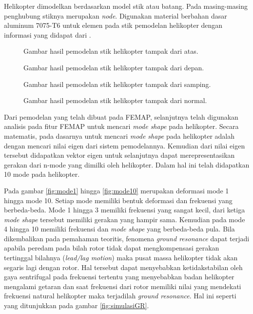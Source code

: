 Helikopter dimodelkan berdasarkan model stik atau batang. Pada masing-masing penghubung stiknya merupakan \textit{node}. Digunakan material berbahan dasar aluminum 7075-T6 untuk elemen pada stik pemodelan helikopter dengan informasi yang didapat dari \cite{ASTM}.

\begin{figure}[H]
	\centering
	\caption{Gambar hasil pemodelan stik helikopter tampak dari atas.}
	\label{fig:simulasi_tampak_atas}
\end{figure}

\begin{figure}[H]
	\centering
	\caption{Gambar hasil pemodelan stik helikopter tampak dari depan.}
	\label{fig:simulasi_tampak_depan}
\end{figure}

\begin{figure}[H]
	\centering
	\caption{Gambar hasil pemodelan stik helikopter tampak dari samping.}
	\label{fig:simulasi_tampak_samping}
\end{figure}

\begin{figure}[H]
	\centering
	\caption{Gambar hasil pemodelan stik helikopter tampak dari normal.}
	\label{fig:simulasi_tampak_normal}
\end{figure}

Dari pemodelan yang telah dibuat pada FEMAP, selanjutnya telah digunakan analisis pada fitur FEMAP untuk mencari \textit{mode shape} pada helikopter. Secara matematis, pada dasarnya untuk mencari \textit{mode shape} pada helikopter adalah dengan mencari nilai eigen dari sistem pemodelannya. Kemudian dari nilai eigen tersebut didapatkan vektor eigen untuk selanjutnya dapat merepresentasikan gerakan dari n-mode yang dimilki oleh helikopter. Dalam hal ini telah didapatkan 10 mode pada helikopter.

Pada gambar \ref{fig:mode1} hingga \ref{fig:mode10} merupakan deformasi mode 1 hingga mode 10. Setiap mode memiliki bentuk deformasi dan frekuensi yang berbeda-beda. Mode 1 hingga 3 memiliki frekuensi yang sangat kecil, dari ketiga \textit{mode shape} tersebut memiliki gerakan yang hampir sama. Kemudian pada mode 4 hingga 10 memiliki frekuensi dan \textit{mode shape} yang berbeda-beda pula. Bila dikembalikan pada pemahaman teoritis, fenomena \textit{ground resonance} dapat terjadi apabila peredam pada bilah rotor tidak dapat mengkompensasi gerakan tertinggal bilahnya (\textit{lead/lag motion}) maka pusat massa helikopter tidak akan segaris lagi dengan rotor. Hal tersebut dapat menyebabkan ketidakstabilan oleh gaya sentrifugal pada frekuensi tertentu yang menyebabkan badan helikopter mengalami getaran dan saat frekuensi dari rotor memiliki nilai yang mendekati frekuensi natural helikopter maka terjadilah \textit{ground resonance}. Hal ini seperti yang ditunjukkan pada gambar \ref{fig:simulasiGR}.

